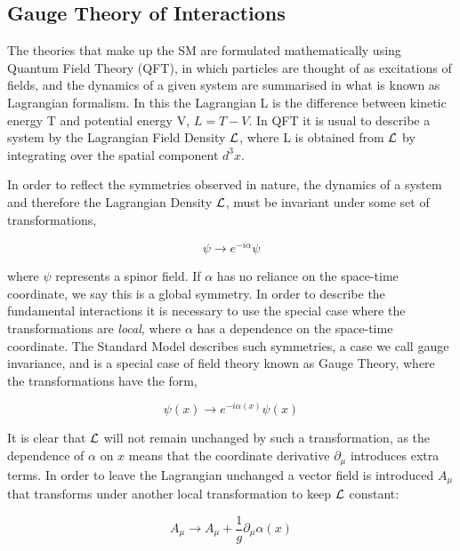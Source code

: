 \subsection{Gauge Theory of Interactions}

The theories that make up the SM are formulated mathematically using Quantum Field Theory (QFT), in which particles are thought of as excitations of fields, and the dynamics of a given system are summarised in what is known as Lagrangian formalism. In this the Lagrangian L is the difference between kinetic energy T and potential energy V, $L = T - V$. In QFT it is usual to describe a system by the Lagrangian Field Density ${\mathcal{L}}$, where L is obtained from ${\mathcal{L}}$ by integrating over the spatial component $d^{3}x$.


In order to reflect the symmetries observed in nature, the dynamics of a system and therefore the Lagrangian Density ${\mathcal{L}}$, must be invariant under some set of transformations,

\begin{equation}
\psi \rightarrow e^{-i\alpha}\psi 
\label{GlobalTrans}
\end{equation}


where $\psi$ represents a spinor field. If $\alpha$ has no reliance on the space-time coordinate, we say this is a global symmetry. In order to describe the fundamental interactions it is necessary to use the special case where the transformations are \textit{local}, where $\alpha$ has a dependence on the space-time coordinate. The Standard Model describes such symmetries, a case we call gauge invariance, and is a special case of field theory known as Gauge Theory, where the transformations have the form, 


\begin{equation}
\psi(x) \rightarrow e^{-i\alpha(x)}\psi (x) 
\label{LocalTrans}
\end{equation}


It is clear that ${\mathcal{L}}$ will not remain unchanged by such a transformation, as the dependence of $\alpha$ on $x$ means that the coordinate derivative $\partial_{\mu}$ introduces extra terms. In order to leave the Lagrangian unchanged a vector field is introduced $A_{\mu}$ that transforms under another local transformation to keep ${\mathcal{L}}$ constant: 

\begin{equation}
A_{\mu} \rightarrow A_{\mu} + \frac{1}{g} \partial_{\mu} \alpha(x)
\label{ATrans}
\end{equation}

